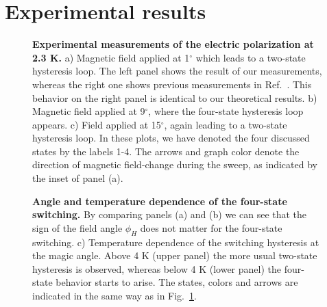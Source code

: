 \section{Experimental results}
\begin{figure}
    \centering
\caption{ \label{fig:GdMn2O5_experiment1} {\bf Experimental measurements of the electric polarization at 2.3 K.} a) Magnetic field applied at 1$^\circ$ which leads to a two-state hysteresis loop. The left panel shows the result of our measurements, whereas the right one shows previous measurements in Ref.~\cite{Lee13}. This behavior on the right panel is identical to our theoretical results. b) Magnetic field applied at 9$^\circ$, where the four-state hysteresis loop appears. c) Field applied at 15$^\circ$, again leading to a two-state hysteresis loop.  
In these plots, we have denoted the four discussed states by the labels 1-4. The arrows and graph color denote the direction of magnetic field-change during the sweep, as indicated by the inset of panel (a).}
\end{figure}
\begin{figure}
    \centering
\caption{ \label{fig:GdMn2O5_experiment2} {\bf Angle and temperature dependence of the four-state switching.} By comparing panels (a) and (b) we can see that the sign of the field angle $\phi_H$ does not matter for the four-state switching. c) Temperature dependence of the switching hysteresis at the magic angle. Above 4 K (upper panel) the more usual two-state hysteresis is observed, whereas below 4 K (lower panel) the four-state behavior starts to arise. The states, colors and arrows are indicated in the same way as in Fig.~\ref{fig:GdMn2O5_experiment1}.}
\end{figure}


